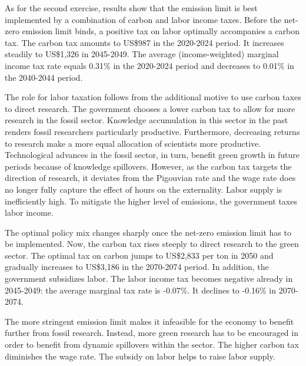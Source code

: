 As for the second exercise, results show that the emission limit is best implemented by a combination of carbon and labor income taxes. Before the net-zero emission limit binds, a positive tax on labor optimally accompanies a carbon tax. The carbon tax amounts to US\$987 in the 2020-2024 period. It increases steadily to US\$1,326 in 2045-2049. The average (income-weighted) marginal income tax rate equals 0.31\% in the 2020-2024 period and decreases to 0.01\% in the 2040-2044 period.

The role for labor taxation follows from the additional motive to use carbon taxes to direct research. The government chooses a lower carbon tax to allow for more research in the fossil sector. Knowledge accumulation in this sector in the past renders fossil researchers particularly productive. Furthermore, decreasing returns to research make a more equal allocation of scientists more productive. Technological advances in the fossil sector, in turn, benefit green growth in future periods because of knowledge spillovers. However, as the carbon tax targets the direction of research, it deviates from the Pigouvian rate and the wage rate does no longer fully capture the effect of hours on the externality. Labor supply is inefficiently high.
To mitigate the higher level of emissions, the government taxes labor income. 

The optimal policy mix changes sharply once the net-zero emission limit has to be implemented. Now, the carbon tax rises steeply to direct research to the green sector. The optimal tax on carbon jumps to US\$2,833 per ton in 2050 and gradually increases to US\$3,186 in the 2070-2074 period. In addition, the government subsidizes labor. The labor income tax becomes negative already in 2045-2049: the average marginal tax rate is -0.07\%. It declines to -0.16\% in 2070-2074.

 The more stringent emission limit makes it infeasible for the economy to benefit further from fossil research. Instead, more green research has to be encouraged in order to benefit from dynamic spillovers within the sector. The higher carbon tax diminishes the wage rate. The subsidy on labor helps to raise labor supply.



